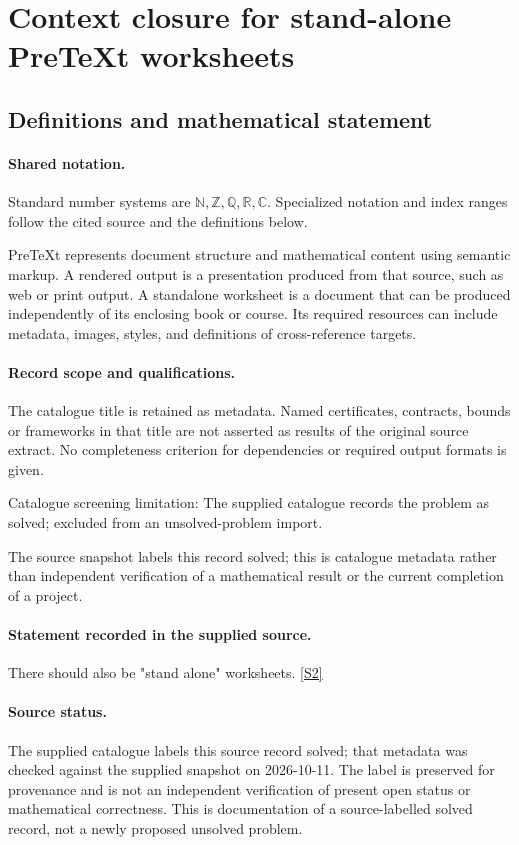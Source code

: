 \documentclass[11pt]{article}
\newcommand{\sref}[2]{\hyperlink{source:#1:#2}{[S#2]}}
\begin{document}
\section{Context closure for stand-alone PreTeXt worksheets}\label{statement}

\subsection{Definitions and mathematical statement}

\paragraph{Shared notation.}Standard number systems are $\mathbb N,\mathbb Z,\mathbb Q,\mathbb R,\mathbb C$. Specialized notation and index ranges follow the cited source and the definitions below.


PreTeXt represents document structure and mathematical content using semantic markup. A rendered output is a presentation produced from that source, such as web or print output. A standalone worksheet is a document that can be produced independently of its enclosing book or course. Its required resources can include metadata, images, styles, and definitions of cross-reference targets.
\paragraph{Record scope and qualifications.}
The catalogue title is retained as metadata. Named certificates, contracts, bounds or frameworks in that title are not asserted as results of the original source extract.
No completeness criterion for dependencies or required output formats is given.

Catalogue screening limitation: The supplied catalogue records the problem as solved; excluded from an unsolved-problem import.

The source snapshot labels this record solved; this is catalogue metadata rather than independent verification of a mathematical result or the current completion of a project.
\paragraph{Statement recorded in the supplied source.}
There should also be "stand alone" worksheets. \sref{statement}{2}
\paragraph{Source status.}
The supplied catalogue labels this source record solved; that metadata was checked against the supplied snapshot on 2026-10-11. The label is preserved for provenance and is not an independent verification of present open status or mathematical correctness. This is documentation of a source-labelled solved record, not a newly proposed unsolved problem.
\end{document}
